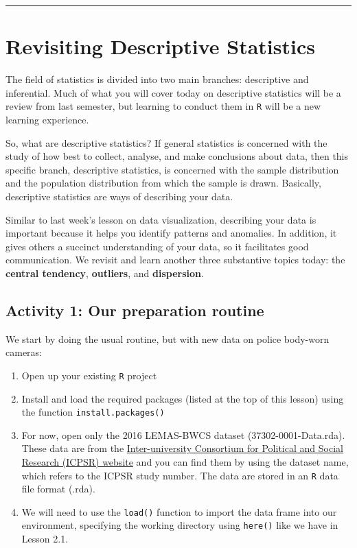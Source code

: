 \documentclass[
]{book}
\begin{document}
\begin{center}\rule{0.5\linewidth}{0.5pt}\end{center}

\hypertarget{revisiting-descriptive-statistics}{%
\section{Revisiting Descriptive Statistics}\label{revisiting-descriptive-statistics}}

The field of statistics is divided into two main branches: descriptive and inferential. Much of what you will cover today on descriptive statistics will be a review from last semester, but learning to conduct them in \texttt{R} will be a new learning experience.

So, what are descriptive statistics? If general statistics is concerned with the study of how best to collect, analyse, and make conclusions about data, then this specific branch, descriptive statistics, is concerned with the sample distribution and the population distribution from which the sample is drawn. Basically, descriptive statistics are ways of describing your data.

Similar to last week's lesson on data visualization, describing your data is important because it helps you identify patterns and anomalies. In addition, it gives others a succinct understanding of your data, so it facilitates good communication. We revisit and learn another three substantive topics today: the \textbf{central tendency}, \textbf{outliers}, and \textbf{dispersion}.

\hypertarget{activity-1-our-preparation-routine}{%
\subsection{Activity 1: Our preparation routine}\label{activity-1-our-preparation-routine}}

We start by doing the usual routine, but with new data on police body-worn cameras:

\begin{enumerate}
\def\labelenumi{\arabic{enumi}.}
\item
  Open up your existing \texttt{R} project
\item
  Install and load the required packages (listed at the top of this lesson) using the function \texttt{install.packages()}
\item
  For now, open only the 2016 LEMAS-BWCS dataset (37302-0001-Data.rda). These data are from the \href{https://www.icpsr.umich.edu/web/pages/}{Inter-university Consortium for Political and Social Research (ICPSR) website} and you can find them by using the dataset name, which refers to the ICPSR study number. The data are stored in an \texttt{R} data file format (.rda).
\item
  We will need to use the \texttt{load()} function to import the data frame into our environment, specifying the working directory using \texttt{here()} like we have in Lesson 2.1.
\end{enumerate}
\end{document}
